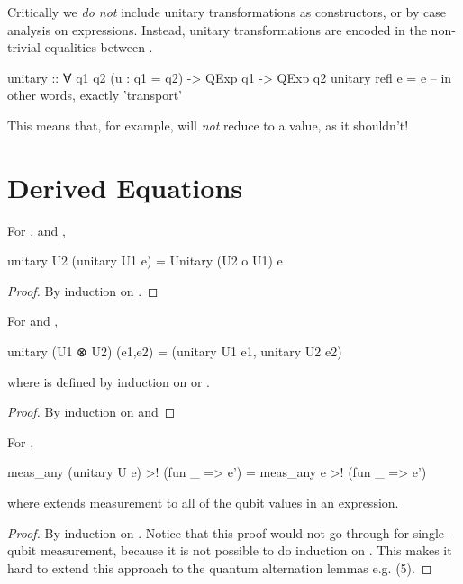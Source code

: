 \documentclass{article}
\begin{document}
Critically we \emph{do not} include unitary transformations as 
constructors, or by case analysis on expressions. Instead, unitary
transformations are encoded in the non-trivial equalities between
.
\begin{haskell}
unitary :: ∀ {q1 q2} (u : q1 = q2) -> QExp q1 -> QExp q2
unitary refl e = e -- in other words, exactly 'transport'
\end{haskell}

This means that, for example,  will
\emph{not} reduce to a value, as it shouldn't! 


\section{Derived Equations}

\begin{proposition}
  For ,  and ,
  \begin{haskell}
    unitary U2 (unitary U1 e) = Unitary (U2 o U1) e
  \end{haskell}
\end{proposition}
\begin{proof} 
    By induction on .
\end{proof}

\begin{proposition}
  For  and , 
  \begin{haskell}
    unitary (U1 ⊗ U2) (e1,e2) = (unitary U1 e1, unitary U2 e2)
  \end{haskell}
    where  is defined by induction on
     or .
\end{proposition}
\begin{proof}
    By induction on  and 
\end{proof}

\begin{proposition}
  For , 
  \begin{haskell}
    meas_any (unitary U e) >! (fun _ => e') = meas_any e >! (fun _ => e')
  \end{haskell}
  where 
  extends measurement to all of the qubit values in an expression.
\end{proposition}
\begin{proof}
  By induction on . Notice that this proof would not go through for
  single-qubit measurement, because it is not possible to do induction on
  . This makes it hard to extend this approach to
  the quantum alternation lemmas e.g. (5).
\end{proof}




\end{document}
